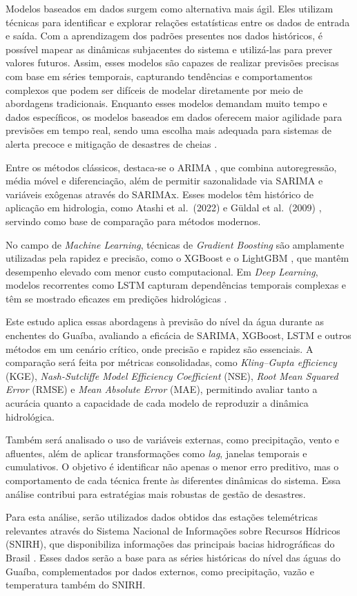 Modelos baseados em dados surgem como alternativa mais ágil. Eles utilizam técnicas para identificar e explorar relações
estatísticas entre os dados de entrada e saída. Com a aprendizagem dos padrões presentes nos dados históricos, é
possível mapear as dinâmicas subjacentes do sistema e utilizá-las para prever valores futuros. Assim, esses modelos são
capazes de realizar previsões precisas com base em séries temporais, capturando tendências e comportamentos complexos
que podem ser difíceis de modelar diretamente por meio de abordagens tradicionais. Enquanto esses modelos demandam muito
tempo e dados específicos, os modelos baseados em dados oferecem maior agilidade para previsões em tempo real, sendo uma
escolha mais adequada para sistemas de alerta precoce e mitigação de desastres de cheias \cite{ta}.

Entre os métodos clássicos, destaca-se o ARIMA \cite{box}, que combina autoregressão, média móvel e diferenciação, além
de permitir sazonalidade via SARIMA e variáveis exôgenas através do SARIMAx. Esses modelos têm histórico de aplicação em
hidrologia, como Atashi et al.\ (2022) \cite{atashi} e Güldal et al.\ (2009) \cite{gudal}, servindo como base de
comparação para métodos modernos.

No campo de \textit{Machine Learning}, técnicas de \textit{Gradient Boosting} são amplamente utilizadas pela rapidez e
precisão, como o XGBoost \cite{chen_xgboost} e o LightGBM \cite{lightgbm}, que mantêm desempenho elevado com menor custo
computacional. Em \textit{Deep Learning}, modelos recorrentes como LSTM \cite{hochreiter} capturam dependências
temporais complexas e têm se mostrado eficazes em predições hidrológicas \cite{borwarnginn}.

Este estudo aplica essas abordagens à previsão do nível da água durante as enchentes do Guaíba, avaliando a eficácia de
SARIMA, XGBoost, LSTM e outros métodos em um cenário crítico, onde precisão e rapidez são essenciais. A comparação será
feita por métricas consolidadas, como \textit{Kling–Gupta efficiency} (KGE), \textit{Nash-Sutcliffe Model Efficiency
Coefficient} (NSE), \textit{Root Mean Squared Error} (RMSE) e \textit{Mean Absolute Error} (MAE), permitindo avaliar
tanto a acurácia quanto a capacidade de cada modelo de reproduzir a dinâmica hidrológica.

Também será analisado o uso de variáveis externas, como precipitação, vento e afluentes, além de aplicar transformações
como \textit{lag}, janelas temporais e cumulativos. O objetivo é identificar não apenas o menor erro preditivo, mas o
comportamento de cada técnica frente às diferentes dinâmicas do sistema. Essa análise contribui para estratégias mais
robustas de gestão de desastres.

Para esta análise, serão utilizados dados  obtidos das estações telemétricas relevantes através do Sistema Nacional de
Informações sobre Recursos Hídricos (SNIRH), que disponibiliza informações das principais bacias hidrográficas do Brasil
\cite{snirh}. Esses dados serão a base para as séries históricas do nível das águas do Guaíba, complementados por dados
externos, como precipitação, vazão e temperatura também do SNIRH.